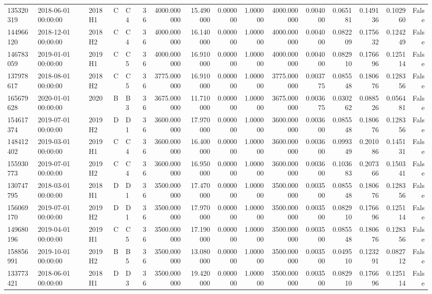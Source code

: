 \begin{tabular}{lllllrrrrrrrrrrr}
135320319 & 2018-06-01 00:00:00 & 2018H1 & C & C4 & 36 & 4000.000000 & 15.490000 & 0.000000 & 1.000000 & 4000.000000 & 0.004000 & 0.065181 & 0.149136 & 0.102960 & False \\
144966120 & 2018-12-01 00:00:00 & 2018H2 & C & C4 & 36 & 4000.000000 & 16.140000 & 0.000000 & 1.000000 & 4000.000000 & 0.004000 & 0.082209 & 0.175632 & 0.124249 & False \\
146783059 & 2019-01-01 00:00:00 & 2019H1 & C & C5 & 36 & 4000.000000 & 16.910000 & 0.000000 & 1.000000 & 4000.000000 & 0.004000 & 0.082910 & 0.176696 & 0.125114 & False \\
137978617 & 2018-08-01 00:00:00 & 2018H2 & C & C5 & 36 & 3775.000000 & 16.910000 & 0.000000 & 1.000000 & 3775.000000 & 0.003775 & 0.085548 & 0.180676 & 0.128356 & False \\
165679628 & 2020-01-01 00:00:00 & 2020 & B & B3 & 36 & 3675.000000 & 11.710000 & 0.000000 & 1.000000 & 3675.000000 & 0.003675 & 0.030262 & 0.088526 & 0.056481 & False \\
154617374 & 2019-07-01 00:00:00 & 2019H2 & D & D1 & 36 & 3600.000000 & 17.970000 & 0.000000 & 1.000000 & 3600.000000 & 0.003600 & 0.085548 & 0.180676 & 0.128356 & False \\
148412402 & 2019-03-01 00:00:00 & 2019H1 & C & C4 & 36 & 3600.000000 & 16.400000 & 0.000000 & 1.000000 & 3600.000000 & 0.003600 & 0.099349 & 0.201086 & 0.145131 & False \\
155930773 & 2019-07-01 00:00:00 & 2019H2 & C & C4 & 36 & 3600.000000 & 16.950000 & 0.000000 & 1.000000 & 3600.000000 & 0.003600 & 0.103683 & 0.207366 & 0.150341 & False \\
130747795 & 2018-03-01 00:00:00 & 2018H1 & D & D1 & 36 & 3500.000000 & 17.470000 & 0.000000 & 1.000000 & 3500.000000 & 0.003500 & 0.085548 & 0.180676 & 0.128356 & False \\
156069170 & 2019-07-01 00:00:00 & 2019H2 & D & D1 & 36 & 3500.000000 & 17.970000 & 0.000000 & 1.000000 & 3500.000000 & 0.003500 & 0.082910 & 0.176696 & 0.125114 & False \\
149680196 & 2019-04-01 00:00:00 & 2019H1 & C & C5 & 36 & 3500.000000 & 17.190000 & 0.000000 & 1.000000 & 3500.000000 & 0.003500 & 0.085548 & 0.180676 & 0.128356 & False \\
158856991 & 2019-10-01 00:00:00 & 2019H2 & B & B5 & 36 & 3500.000000 & 13.080000 & 0.000000 & 1.000000 & 3500.000000 & 0.003500 & 0.049510 & 0.123291 & 0.082712 & False \\
133773421 & 2018-06-01 00:00:00 & 2018H1 & D & D3 & 36 & 3500.000000 & 19.420000 & 0.000000 & 1.000000 & 3500.000000 & 0.003500 & 0.082910 & 0.176696 & 0.125114 & False \\

\end{tabular}
